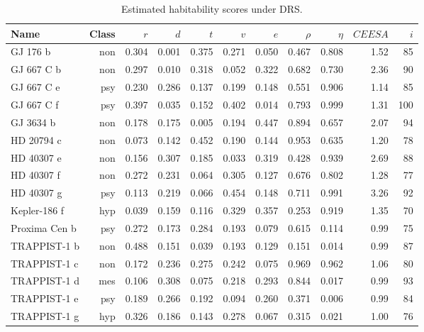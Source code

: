 \documentclass[9pt]{article}
\begin{document}
\begin{table}
  \centering
  \begin{subtable}{\textwidth}
    \centering
    \begin{tabular}{l r r r r r r r r r r}
      \toprule
      Name & Class & $r$ & $d$ & $t$ & $v$ & $e$ & $\rho$ & $\eta$ & $\mathit{CEESA}$ & $i$\\
      \midrule
      GJ 176 b & non & 0.304 & 0.001 & 0.375 & 0.271 & 0.050 & 0.467 & 0.808 & 1.52 &  85\\
      GJ 667 C b & non & 0.297 & 0.010 & 0.318 & 0.052 & 0.322 & 0.682 & 0.730 & 2.36 &  90\\
      GJ 667 C e & psy & 0.230 & 0.286 & 0.137 & 0.199 & 0.148 & 0.551 & 0.906 & 1.14 &  85\\
      GJ 667 C f & psy & 0.397 & 0.035 & 0.152 & 0.402 & 0.014 & 0.793 & 0.999 & 1.31 & 100\\
      GJ 3634 b & non & 0.178 & 0.175 & 0.005 & 0.194 & 0.447 & 0.894 & 0.657 & 2.07 &  94\\
      HD 20794 c & non & 0.073 & 0.142 & 0.452 & 0.190 & 0.144 & 0.953 & 0.635 & 1.20 &  78\\
      HD 40307 e & non & 0.156 & 0.307 & 0.185 & 0.033 & 0.319 & 0.428 & 0.939 & 2.69 &  88\\
      HD 40307 f & non & 0.272 & 0.231 & 0.064 & 0.305 & 0.127 & 0.676 & 0.802 & 1.28 &  77\\
      HD 40307 g & psy & 0.113 & 0.219 & 0.066 & 0.454 & 0.148 & 0.711 & 0.991 & 3.26 &  92\\
      Kepler-186 f & hyp & 0.039 & 0.159 & 0.116 & 0.329 & 0.357 & 0.253 & 0.919 & 1.35 &  70\\
      Proxima Cen b & psy & 0.272 & 0.173 & 0.284 & 0.193 & 0.079 & 0.615 & 0.114 & 0.99 &  75\\
      TRAPPIST-1 b & non & 0.488 & 0.151 & 0.039 & 0.193 & 0.129 & 0.151 & 0.014 & 0.99 &  87\\
      TRAPPIST-1 c & non & 0.172 & 0.236 & 0.275 & 0.242 & 0.075 & 0.969 & 0.962 & 1.06 &  80\\
      TRAPPIST-1 d & mes & 0.106 & 0.308 & 0.075 & 0.218 & 0.293 & 0.844 & 0.017 & 0.99 &  93\\
      TRAPPIST-1 e & psy & 0.189 & 0.266 & 0.192 & 0.094 & 0.260 & 0.371 & 0.006 & 0.99 &  84\\
      TRAPPIST-1 g & hyp & 0.326 & 0.186 & 0.143 & 0.278 & 0.067 & 0.315 & 0.021 & 1.00 &  76\\
      \bottomrule
    \end{tabular}
    \caption{Estimated habitability scores under DRS.}\label{tab:ceesadrs}
  \end{subtable}
  

\end{table}
\end{document}
